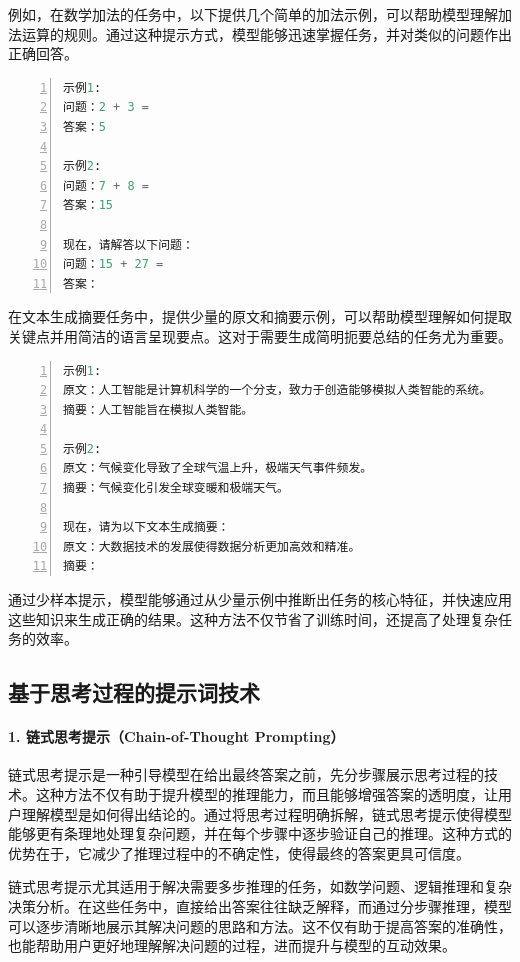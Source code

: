 例如，在数学加法的任务中，以下提供几个简单的加法示例，可以帮助模型理解加法运算的规则。通过这种提示方式，模型能够迅速掌握任务，并对类似的问题作出正确回答。

\begin{lstlisting}[language={python},label={},caption={}, basicstyle=\footnotesize\ttfamily, breaklines=true, numbers=left, frame=single]
示例1:
问题：2 + 3 =
答案：5

示例2:
问题：7 + 8 =
答案：15

现在，请解答以下问题：
问题：15 + 27 =
答案：
\end{lstlisting}

在文本生成摘要任务中，提供少量的原文和摘要示例，可以帮助模型理解如何提取关键点并用简洁的语言呈现要点。这对于需要生成简明扼要总结的任务尤为重要。

\begin{lstlisting}[language={python},label={},caption={}, basicstyle=\footnotesize\ttfamily, breaklines=true, numbers=left, frame=single]
示例1:
原文：人工智能是计算机科学的一个分支，致力于创造能够模拟人类智能的系统。
摘要：人工智能旨在模拟人类智能。

示例2:
原文：气候变化导致了全球气温上升，极端天气事件频发。
摘要：气候变化引发全球变暖和极端天气。

现在，请为以下文本生成摘要：
原文：大数据技术的发展使得数据分析更加高效和精准。
摘要：
\end{lstlisting}

通过少样本提示，模型能够通过从少量示例中推断出任务的核心特征，并快速应用这些知识来生成正确的结果。这种方法不仅节省了训练时间，还提高了处理复杂任务的效率。

\subsection{基于思考过程的提示词技术}

\paragraph{1. 链式思考提示（Chain-of-Thought Prompting）} 

链式思考提示是一种引导模型在给出最终答案之前，先分步骤展示思考过程的技术。这种方法不仅有助于提升模型的推理能力，而且能够增强答案的透明度，让用户理解模型是如何得出结论的。通过将思考过程明确拆解，链式思考提示使得模型能够更有条理地处理复杂问题，并在每个步骤中逐步验证自己的推理。这种方式的优势在于，它减少了推理过程中的不确定性，使得最终的答案更具可信度。

链式思考提示尤其适用于解决需要多步推理的任务，如数学问题、逻辑推理和复杂决策分析。在这些任务中，直接给出答案往往缺乏解释，而通过分步骤推理，模型可以逐步清晰地展示其解决问题的思路和方法。这不仅有助于提高答案的准确性，也能帮助用户更好地理解解决问题的过程，进而提升与模型的互动效果。

